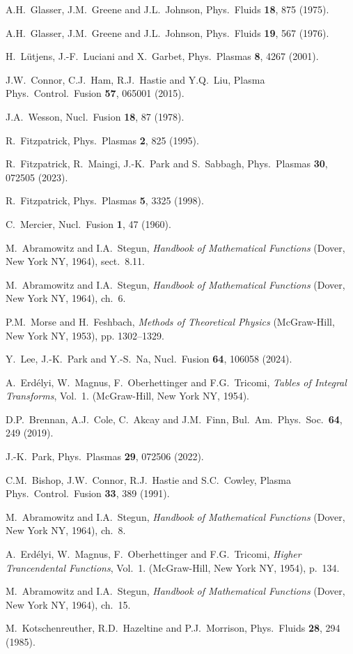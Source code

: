 \documentclass[12pt,prb,aps]{revtex4-1}
\begin{document}
\begin{thebibliography}{99}
 A.H.~Glasser, J.M.~Greene and J.L.~Johnson, Phys.\ Fluids {\bf 18}, 875 (1975).

 A.H.~Glasser, J.M.~Greene  and J.L.~Johnson, Phys.\ Fluids {\bf 19}, 567 (1976).

 H.~L\"{u}tjens, J.-F.~Luciani and X.~Garbet, Phys.\ Plasmas {\bf 8}, 4267 (2001).

 J.W.~Connor, C.J.~Ham, R.J.~Hastie and Y.Q.~Liu, Plasma Phys.\ Control.\ Fusion {\bf 57}, 065001 (2015). 

 J.A.~Wesson, Nucl.\ Fusion {\bf 18},  87 (1978).

 R.~Fitzpatrick, Phys.\ Plasmas {\bf 2}, 825 (1995).

 R.~Fitzpatrick, R.~Maingi, J.-K.~Park and S.~Sabbagh, Phys.\ Plasmas {\bf 30}, 072505 (2023).

 R.~Fitzpatrick, Phys.\ Plasmas {\bf 5}, 3325 (1998).

 C.~Mercier, Nucl.\ Fusion {\bf 1}, 47 (1960).

 M.~Abramowitz and I.A.~Stegun, {\em Handbook of Mathematical Functions}\/ (Dover, New York NY, 1964), sect.~8.11.

 M.~Abramowitz and I.A.~Stegun, {\em Handbook of Mathematical Functions}\/ (Dover, New York NY, 1964), ch.~6.

 P.M.~Morse and H.~Feshbach, {\em Methods of Theoretical Physics}\/ (McGraw-Hill, New York NY, 1953), pp. 1302–1329.

 Y.~Lee, J.-K.~Park and Y.-S.~Na, Nucl.\ Fusion {\bf 64}, 106058 (2024). 

 A.~Erd\'{e}lyi, W.~Magnus, F.~Oberhettinger and F.G.~Tricomi, {\em Tables of Integral Transforms}, Vol.~1. (McGraw-Hill, New York NY, 1954).

 D.P.~Brennan, A.J.~Cole, C.~Akcay and J.M.~Finn, Bul.\ Am.\ Phys.\ Soc.\ {\bf 64}, 249 (2019).

 J.-K.~Park, Phys.\ Plasmas {\bf 29}, 072506 (2022).

 C.M.~Bishop, J.W.~Connor, R.J.~Hastie and S.C.~Cowley, Plasma Phys.\ Control.\ Fusion {\bf 33}, 389 (1991). 

 M.~Abramowitz and I.A.~Stegun, {\em Handbook of Mathematical Functions}\/ (Dover, New York NY, 1964), ch.~8.

 A.~Erd\'{e}lyi, W.~Magnus, F.~Oberhettinger and F.G.~Tricomi, {\em Higher Trancendental Functions}, Vol.~1. (McGraw-Hill, New York NY, 1954), p.~134.

 M.~Abramowitz and I.A.~Stegun, {\em Handbook of Mathematical Functions}\/ (Dover, New York NY, 1964), ch.~15.

 M.~Kotschenreuther, R.D.~Hazeltine and P.J.~Morrison, Phys.\ Fluids {\bf 28}, 294 (1985). 

\end{thebibliography}
\end{document}
